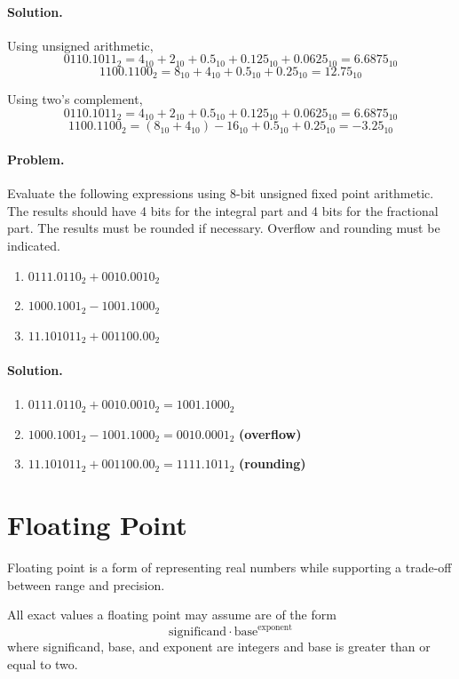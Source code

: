 \documentclass[oneside]{book}
\begin{document}
\paragraph{Solution.}
Using unsigned arithmetic,
\[0110.1011_{2} = 4_{10} + 2_{10} + 0.5_{10} + 0.125_{10} + 0.0625_{10}
  = 6.6875_{10}\]
\[1100.1100_{2} = 8_{10} + 4_{10} + 0.5_{10} + 0.25_{10} = 12.75_{10}\]

Using two's complement,
\[0110.1011_{2} = 4_{10} + 2_{10} + 0.5_{10} + 0.125_{10} + 0.0625_{10}
 = 6.6875_{10}\]
\[1100.1100_{2} = \left( 8_{10} + 4_{10} \right) - 16_{10} + 0.5_{10}
 + 0.25_{10} = -3.25_{10}\]

\paragraph{Problem.}
Evaluate the following expressions using 8-bit unsigned
fixed point arithmetic. The results should have 4 bits for the integral part and
4 bits for the fractional part. The results must be rounded if necessary.
Overflow and rounding must be indicated.

\begin{enumerate}
    \item \(0111.0110_{2} + 0010.0010_{2}\)
    \item \(1000.1001_{2} - 1001.1000_{2}\)
    \item \(11.101011_{2} + 001100.00_{2}\)
\end{enumerate}

\paragraph{Solution.}
\begin{enumerate}
    \item \(0111.0110_{2} + 0010.0010_{2} = 1001.1000_{2}\)
    \item \(1000.1001_{2} - 1001.1000_{2} = 0010.0001_{2}\) \textbf{(overflow)}
    \item \(11.101011_{2} + 001100.00_{2} = 1111.1011_{2}\) \textbf{(rounding)}
\end{enumerate}

\section{Floating Point}
Floating point is a form of representing real numbers while supporting a
trade-off between range and precision.

All exact values a floating point may assume are of the form
\[\text{significand} \cdot \text{base}^\text{exponent}\]
where significand, base, and exponent are integers and base is greater than or
equal to two.
\end{document}
